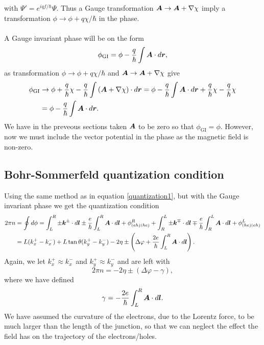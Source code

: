 with $\Psi' = e^{iqf/\hbar}\Psi$. Thus a Gauge transformation $\boldsymbol{A} \rightarrow \boldsymbol{A} + \nabla \chi$ imply a transformation $\phi \rightarrow \phi + q\chi/\hbar$ in the phase.
\\
\\
A Gauge invariant phase will be on the form
\begin{equation}
    \phi_{\mathrm{GI}} = \phi - \frac{q}{\hbar}\int\boldsymbol{A}\cdot d\boldsymbol{r},
\end{equation}
as transformation $\phi \rightarrow \phi + q\chi/\hbar$ and $\boldsymbol{A}\rightarrow \boldsymbol{A} + \nabla\chi$ give
\begin{equation}
\begin{split}
    \phi_{\mathrm{GI}} &\rightarrow \phi + \frac{q}{\hbar}\chi - \frac{q}{\hbar}\int\left(\boldsymbol{A} + \nabla \chi \right)\cdot d\boldsymbol{r} = \phi - \frac{q}{\hbar}\int \boldsymbol{A} \cdot d \boldsymbol{r} + \frac{q}{\hbar}\chi - \frac{q}{\hbar}\chi \\
    &= \phi - \frac{q}{\hbar} \int \boldsymbol{A}\cdot d\boldsymbol{r}.
\end{split}
\end{equation}
We have in the preveous sections taken $\boldsymbol{A}$ to be zero so that $\phi_{\mathrm{GI}} = \phi$. However, now we must include the vector potential in the phase as the magnetic field is non-zero.

\subsection{Bohr-Sommerfeld quantization condition}
Using the same method as in equation \eqref{quantization1}, but with the Gauge invariant phase we get the quantization condition
\begin{equation}
\begin{split}
    2\pi n &= \oint d\phi = \int_{L}^{R}\pm \boldsymbol{k}^{\pm}\cdot d\boldsymbol{l} \pm \frac{e}{\hbar}\int_L^R\boldsymbol{A}\cdot d\boldsymbol{l} + \phi^R_{(eh)(he)} + \int_{R}^{L}\pm \boldsymbol{k}^{\mp}\cdot d\boldsymbol{l} \mp \frac{e}{\hbar}\int_R^L\boldsymbol{A}\cdot d\boldsymbol{l} + \phi^L_{(he)(eh)}\\
    &=L(k_x^+-k_x^-)+L\tan\theta(k_y^+-k_y^-) - 2\eta \pm\left( \Delta\varphi + \frac{2e}{\hbar}\int_L^R \boldsymbol{A}\cdot d\boldsymbol{l}\right).
\end{split}
\end{equation}
Again, we let $k_x^+ \approx k_x^-$ and $k_y^+ \approx k_y^-$ and are left with 
\begin{equation}
    2\pi n = - 2\eta \pm\left( \Delta\varphi - \gamma \right),
\end{equation}
where we have defined
\begin{equation}
\gamma = -\frac{2e}{\hbar}\int_L^R \boldsymbol{A}\cdot d\boldsymbol{l}.
\label{gamma}
\end{equation}
We have assumed the curvature of the electrons, due to the Lorentz force, to be much larger than the length of the junction, so that we can neglect the effect the field has on the trajectory of the electrons/holes. 

